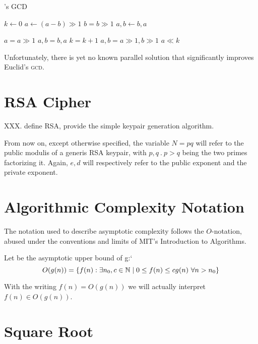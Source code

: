 \begin{algorithm}
  \caption{\openssl's GCD \label{alg:gcd}}
  \begin{algorithmic}[1]
    \State $k \gets 0$
          \State $a \gets (a-b) \gg 1$
        \Else
          \State $b = b \gg 1$
        \EndIf
         $a, b \gets b, a$ \EndIf

      \Else
          \State $a = a \gg 1$
           $a, b = b, a$ \EndIf
        \Else
          \State $k = k+1$
          \State $a, b = a \gg 1, b \gg 1$
        \EndIf
      \EndIf
    \EndWhile
    \State \Return $a \ll k$

  \end{algorithmic}
\end{algorithm}

Unfortunately, there is yet no known parallel solution that significantly improves
Euclid's \textsc{gcd}.

\section{RSA Cipher}

XXX.
define RSA, provide the simple keypair generation algorithm.

From now on, except otherwise specified, the variable $N=pq$ will refer to the
public modulis of a generis RSA keypair, with $p, q\ .\ p > q$ being the two primes
factorizing it. Again, $e, d$ will respectively refer to the public exponent and
the private exponent.


\section{Algorithmic Complexity Notation}
The notation used to describe asymptotic complexity follows the $O$-notation,
abused under the conventions and limits of MIT's Introduction to Algorithms.

Let  be the asymptotic upper bound of g:`
$$
O(g(n)) = \{ f(n) : \exists n_0, c \in \mathbb{N} \mid 0 \leq f(n) \leq cg(n)
\ \forall n > n_0 \}
$$

With the writing $f(n) = O(g(n))$ we will actually interpret
$f(n) \in O(g(n))$.

\section{Square Root \label{sec:preq:sqrt}}


